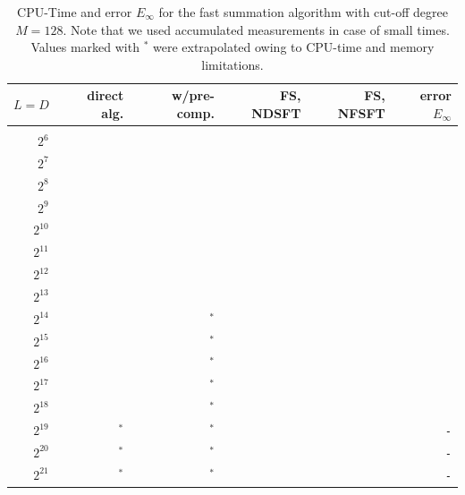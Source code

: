 \documentclass[11pt,a4paper,twoside,bibtotoc]{scrartcl}
\theoremstyle{plain}
\theoremstyle{definition}
\theoremstyle{remark}
\numberwithin{equation}{section}
\numberwithin{table}{section}
\numberwithin{figure}{section}
\begin{document}
\begin{table}[ht!]
  \begin{center}
    \begin{tabular}{r|r|r|r|r|r}
         $L = D$ &      direct alg.   &     w/pre-comp.     &      FS, NDSFT &      FS, NFSFT & error $E_{\infty}$\\\hline\\[-2.0ex]
           $2^6$ & \verb#1.0E-05#     & \verb#8.0E-05#     & \verb#1.1E-01# & \verb#6.2E-01# & \verb#7.7E-14# \\
           $2^7$ & \verb#6.0E-05#     & \verb#3.8E-04#     & \verb#2.2E-01# & \verb#6.2E-01# & \verb#6.5E-14# \\
           $2^8$ & \verb#2.5E-04#     & \verb#1.4E-03#     & \verb#4.5E-01# & \verb#6.2E-01# & \verb#4.1E-14# \\
           $2^9$ & \verb#1.0E-03#     & \verb#5.3E-03#     & \verb#8.9E-01# & \verb#6.3E-01# & \verb#2.8E-14# \\
        $2^{10}$ & \verb#4.0E-02#     & \verb#2.1E-02#     & \verb#1.8E+00# & \verb#6.5E-01# & \verb#3.6E-14# \\
        $2^{11}$ & \verb#1.6E+00#     & \verb#8.3E-02#     & \verb#3.6E+00# & \verb#6.6E-01# & \verb#1.8E-14# \\
        $2^{12}$ & \verb#6.4E+00#     & \verb#3.5E-01#     & \verb#7.1E+00# & \verb#7.2E-01# & \verb#1.3E-14# \\
        $2^{13}$ & \verb#2.6E+01#     & \verb#1.4E+00#     & \verb#1.4E+01# & \verb#8.2E-01# & \verb#6.7E-15# \\
        $2^{14}$ & \verb#1.0E+02#     & $^*$\verb#5.6E+00# & \verb#2.8E+01# & \verb#1.0E+00# & \verb#5.5E-15# \\
        $2^{15}$ & \verb#4.1E+02#     & $^*$\verb#2.2E+01# & \verb#5.7E+01# & \verb#1.5E+00# & \verb#4.0E-15# \\
        $2^{16}$ & \verb#1.6E+03#     & $^*$\verb#8.9E+01# & \verb#1.1E+02# & \verb#2.3E+00# & \verb#2.9E-15# \\
        $2^{17}$ & \verb#6.6E+03#     & $^*$\verb#3.6E+02# & \verb#2.3E+02# & \verb#4.0E+00# & \verb#2.4E-15# \\
        $2^{18}$ & \verb#2.6E+04#     & $^*$\verb#1.4E+03# & \verb#4.6E+02# & \verb#7.5E+00# & \verb#1.9E-15# \\
        $2^{19}$ & $^*$\verb#1.0E+05# & $^*$\verb#5.7E+03# & \verb#9.1E+02# & \verb#1.4E+01# & \verb#-# \\
        $2^{20}$ & $^*$\verb#4.2E+05# & $^*$\verb#2.3E+04# & \verb#1.8E+03# & \verb#2.8E+01# & \verb#-# \\
        $2^{21}$ & $^*$\verb#1.7E+06# & $^*$\verb#9.1E+04# & \verb#3.6E+03# & \verb#5.5E+01# & \verb#-# \\
    \end{tabular}

  \end{center}
  \caption{CPU-Time and error $E_{\infty}$ for the fast summation algorithm with cut-off degree $M = 128$.
    Note that we used accumulated measurements in case of small times. Values 
    marked with $^{*}$ were extrapolated owing to CPU-time and memory limitations.}
  \label{tab:TimeSpace}
\end{table}
\end{document}
